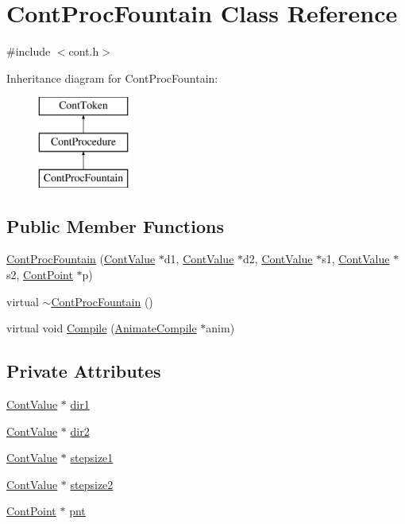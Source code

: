 \hypertarget{a00072}{\section{Cont\-Proc\-Fountain Class Reference}
\label{a00072}
}


{\ttfamily \#include $<$cont.\-h$>$}

Inheritance diagram for Cont\-Proc\-Fountain\-:\begin{figure}[H]
\begin{center}
\leavevmode
\includegraphics[height=3.000000cm]{a00072}
\end{center}
\end{figure}
\subsection*{Public Member Functions}
\begin{DoxyCompactItemize}
\item 
\hyperlink{a00072_aca2c6b542c6c785b923a46e098036ace}{Cont\-Proc\-Fountain} (\hyperlink{a00086}{Cont\-Value} $\ast$d1, \hyperlink{a00086}{Cont\-Value} $\ast$d2, \hyperlink{a00086}{Cont\-Value} $\ast$s1, \hyperlink{a00086}{Cont\-Value} $\ast$s2, \hyperlink{a00062}{Cont\-Point} $\ast$p)
\item 
virtual \hyperlink{a00072_ac740967b07c7b5dfced9cae62d0410fc}{$\sim$\-Cont\-Proc\-Fountain} ()
\item 
virtual void \hyperlink{a00072_a855a7fb74c148f0267862625fc4d3216}{Compile} (\hyperlink{a00007}{Animate\-Compile} $\ast$anim)
\end{DoxyCompactItemize}
\subsection*{Private Attributes}
\begin{DoxyCompactItemize}
\item 
\hyperlink{a00086}{Cont\-Value} $\ast$ \hyperlink{a00072_aef7f3257c44eb70b6a6a7cb84ce145b2}{dir1}
\item 
\hyperlink{a00086}{Cont\-Value} $\ast$ \hyperlink{a00072_ab6177ddc4540a0d5e987b317955e5f2c}{dir2}
\item 
\hyperlink{a00086}{Cont\-Value} $\ast$ \hyperlink{a00072_aecf7f8806b9d5d8c0ee60df2afe76a56}{stepsize1}
\item 
\hyperlink{a00086}{Cont\-Value} $\ast$ \hyperlink{a00072_a230a7d97b18971908811d5b2f920d4e0}{stepsize2}
\item 
\hyperlink{a00062}{Cont\-Point} $\ast$ \hyperlink{a00072_aa201aa8879ac43945d68aa669aa4a3ff}{pnt}
\end{DoxyCompactItemize}

